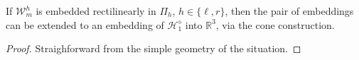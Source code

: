 \begin{proposition}
\label{cor:embedcone}
If $\mathcal{W}_m^h$ is embedded rectilinearly in $\Pi_h$, $h \in \{\ell,r\}$,
then the pair of embeddings can be 
extended to an embedding of $\mathcal{H}^\diamond_1$ into $\mathbb{R}^3$,
via the cone construction.
\end{proposition}
\begin{proof}
 Straighforward from the simple geometry of the situation.
\end{proof}






